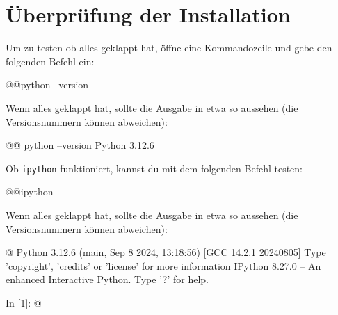 \section*{Überprüfung der Installation}\label{sec:check}
Um zu testen ob alles geklappt hat, öffne eine Kommandozeile und gebe den folgenden Befehl ein:
\begin{commandshell}
    @\shellprefix{}@python --version
\end{commandshell}

Wenn alles geklappt hat, sollte die Ausgabe in etwa so aussehen (die Versionsnummern können abweichen):
\begin{commandshell}[][]
    @\shellprefix{}@ python --version
    Python 3.12.6
\end{commandshell}

Ob \texttt{ipython} funktioniert, kannst du mit dem folgenden Befehl testen:
\begin{commandshell}
    @\shellprefix{}@ipython
\end{commandshell}
Wenn alles geklappt hat, sollte die Ausgabe in etwa so aussehen (die Versionsnummern können abweichen):
\begin{commandshell}[][minted language=text]
    @\shellprefix@ipython
    Python 3.12.6 (main, Sep  8 2024, 13:18:56) [GCC 14.2.1 20240805]
    Type 'copyright', 'credits' or 'license' for more information
    IPython 8.27.0 -- An enhanced Interactive Python. Type '?' for help.

    In [1]: @\shellcursor@
\end{commandshell}


